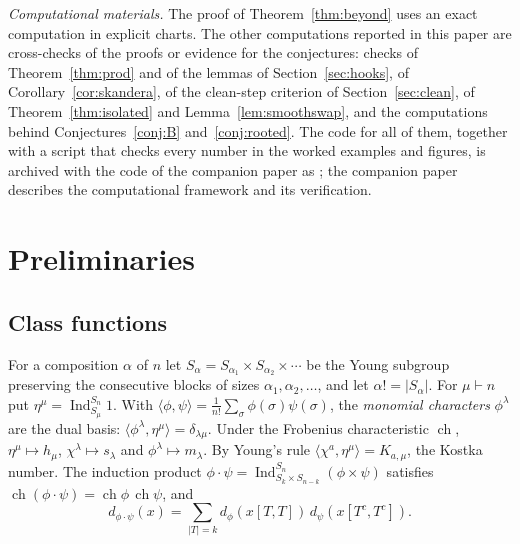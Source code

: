 \documentclass[11pt]{amsart}
\theoremstyle{definition}
\theoremstyle{remark}
\newcommand{\Ind}{\operatorname{Ind}}
\DeclareMathOperator{\ch}{ch}
\begin{document}
\emph{Computational materials.} The proof of Theorem~\ref{thm:beyond} uses an exact computation in explicit charts. The other computations reported in this paper are cross-checks of the proofs or evidence for the conjectures: checks of Theorem~\ref{thm:prod} and of the lemmas of Section~\ref{sec:hooks}, of Corollary~\ref{cor:skandera}, of the clean-step criterion of Section~\ref{sec:clean}, of Theorem~\ref{thm:isolated} and Lemma~\ref{lem:smoothswap}, and the computations behind Conjectures~\ref{conj:B} and~\ref{conj:rooted}. The code for all of them, together with a script that checks every number in the worked examples and figures, is archived with the code of the companion paper \cite{McN} as \cite{McNcode}; the companion paper describes the computational framework and its verification.

\section{Preliminaries}\label{sec:prelim}

\subsection{Class functions}
For a composition $\alpha$ of $n$ let $S_\alpha=S_{\alpha_1}\times S_{\alpha_2}\times\cdots$ be the Young subgroup preserving the consecutive blocks of sizes $\alpha_1,\alpha_2,\dots$, and let $\alpha!=|S_\alpha|$. For $\mu\vdash n$ put $\eta^\mu=\Ind_{S_\mu}^{S_n}1$. With $\langle\phi,\psi\rangle=\frac1{n!}\sum_\sigma\phi(\sigma)\psi(\sigma)$, the \emph{monomial characters} $\phi^\lambda$ are the dual basis: $\langle\phi^\lambda,\eta^\mu\rangle=\delta_{\lambda\mu}$. Under the Frobenius characteristic $\ch$, $\eta^\mu\mapsto h_\mu$, $\chi^\lambda\mapsto s_\lambda$ and $\phi^\lambda\mapsto m_\lambda$. By Young's rule $\langle\chi^a,\eta^\mu\rangle=K_{a,\mu}$, the Kostka number. The induction product $\phi\cdot\psi=\Ind_{S_k\times S_{n-k}}^{S_n}(\phi\times\psi)$ satisfies $\ch(\phi\cdot\psi)=\ch\phi\,\ch\psi$, and
\begin{equation}\label{eq:indprod}
d_{\phi\cdot\psi}(x)=\sum_{|T|=k}d_\phi(x[T,T])\,d_\psi(x[T^c,T^c]).
\end{equation}
\end{document}
